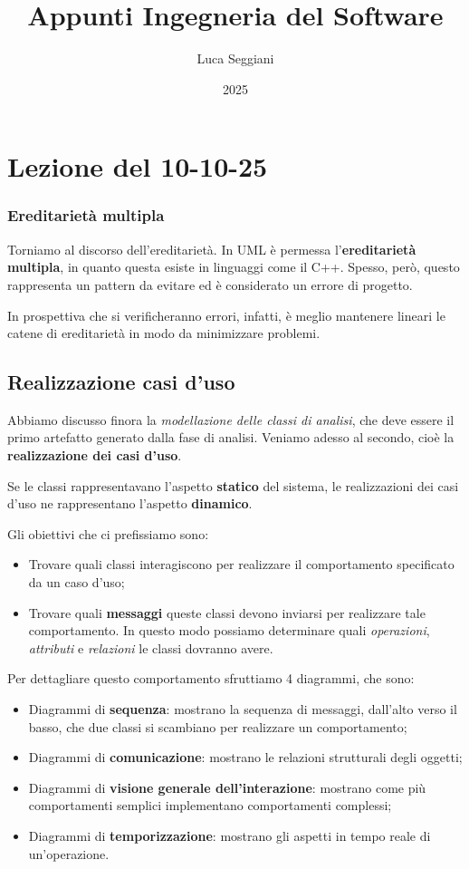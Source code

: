\documentclass[a4paper,11pt]{article}
\title{Appunti Ingegneria del Software}
\author{Luca Seggiani}
\date{2025}
\begin{document}
\section{Lezione del 10-10-25}

\thispagestyle{empty}
\pagestyle{fancy}

\subsubsection{Ereditarietà multipla}
Torniamo al discorso dell'ereditarietà.
In UML è permessa l'\textbf{ereditarietà multipla}, in quanto questa esiste in linguaggi come il C++.
Spesso, però, questo rappresenta un pattern da evitare ed è considerato un errore di progetto.

In prospettiva che si verificheranno errori, infatti, è meglio mantenere lineari le catene di ereditarietà in modo da minimizzare problemi.

\subsection{Realizzazione casi d'uso}
Abbiamo discusso finora la \textit{modellazione delle classi di analisi}, che deve essere il primo artefatto generato dalla fase di analisi.
Veniamo adesso al secondo, cioè la \textbf{realizzazione dei casi d'uso}.

Se le classi rappresentavano l'aspetto \textbf{statico} del sistema, le realizzazioni dei casi d'uso ne rappresentano l'aspetto \textbf{dinamico}.

Gli obiettivi che ci prefissiamo sono:
\begin{itemize}
	\item Trovare quali classi interagiscono per realizzare il comportamento specificato da un caso d'uso;
	\item Trovare quali \textbf{messaggi} queste classi devono inviarsi per realizzare tale comportamento. In questo modo possiamo determinare quali \textit{operazioni}, \textit{attributi} e \textit{relazioni} le classi dovranno avere.
\end{itemize}

Per dettagliare questo comportamento sfruttiamo 4 diagrammi, che sono:
\begin{itemize}
	\item Diagrammi di \textbf{sequenza}: mostrano la sequenza di messaggi, dall'alto verso il basso, che due classi si scambiano per realizzare un comportamento;
	\item Diagrammi di \textbf{comunicazione}: mostrano le relazioni strutturali degli oggetti;
	\item Diagrammi di \textbf{visione generale dell'interazione}: mostrano come più comportamenti semplici implementano comportamenti complessi;
	\item Diagrammi di \textbf{temporizzazione}: mostrano gli aspetti in tempo reale di un'operazione.
\end{itemize}
\end{document}
